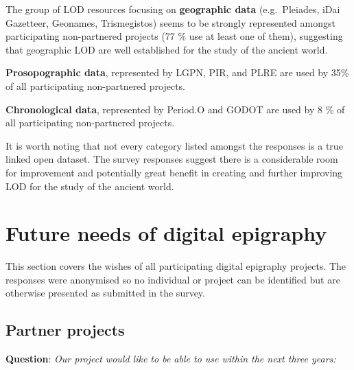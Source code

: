 \documentclass[
  12pt,
]{scrreprt}
\begin{document}
\footnotesize

\normalsize

The group of LOD resources focusing on \textbf{geographic data}
(e.g.~Pleiades, iDai Gazetteer, Geonames, Trismegistos) seems to be
strongly represented amongst participating non-partnered projects (77 \%
use at least one of them), suggesting that geographic LOD are well
established for the study of the ancient world.

\textbf{Prosopographic data}, represented by LGPN, PIR, and PLRE are
used by 35\% of all participating non-partnered projects.

\textbf{Chronological data}, represented by Period.O and GODOT are used
by 8 \% of all participating non-partnered projects.

It is worth noting that not every category listed amongst the responses
is a true linked open dataset. The survey responses suggest there is a
considerable room for improvement and potentially great benefit in
creating and further improving LOD for the study of the ancient world.

\hypertarget{future-needs-of-digital-epigraphy}{%
\chapter{Future needs of digital
epigraphy}\label{future-needs-of-digital-epigraphy}}

This section covers the wishes of all participating digital epigraphy
projects. The responses were anonymised so no individual or project can
be identified but are otherwise presented as submitted in the survey.

\hypertarget{partner-projects}{%
\section{Partner projects}\label{partner-projects}}

\textbf{Question}: \emph{Our project would like to be able to use within
the next three years:}

\footnotesize
\end{document}
